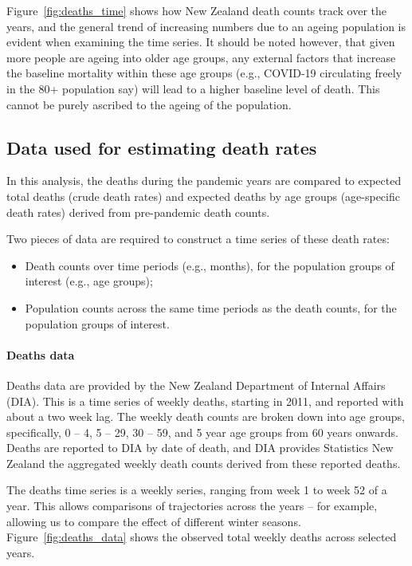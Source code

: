 \documentclass[
10pt, %
a4paper, %
oneside, %
DIV=16,
parskip=full,
headinclude,footinclude %
]{scrartcl}
\begin{document}
Figure~\vref{fig:deaths_time} shows how New Zealand death counts track over the years, and the general trend of increasing numbers due to an ageing population is evident when examining the time series. It should be noted however, that given more people are ageing into older age groups, any external factors that increase the baseline mortality within these age groups (e.g., COVID-19 circulating freely in the 80+ population say) will lead to a higher baseline level of death. This cannot be purely ascribed to the ageing of the population.


\subsection{Data used for estimating death rates}\label{subsec:data}

In this analysis, the deaths during the pandemic years are compared to expected total deaths (crude death rates) and expected deaths by age groups (age-specific death rates) derived from pre-pandemic death counts. 

Two pieces of data are required to construct a time series of these death rates:

\begin{itemize}
    \item Death counts over time periods (e.g., months), for the population groups of interest (e.g., age groups);
    \item Population counts across the same time periods as the death counts, for the population groups of interest.
\end{itemize}

\paragraph{Deaths data} Deaths data are provided by the New Zealand Department of Internal Affairs (DIA). This is a time series of weekly deaths, starting in 2011, and reported with about a two week lag. The weekly death counts are broken down into age groups, specifically, 0 -- 4, 5 -- 29, 30 -- 59, and 5 year age groups from 60 years onwards. Deaths are reported to DIA by date of death, and DIA provides Statistics New Zealand the aggregated weekly death counts derived from these reported deaths.

The deaths time series is a weekly series, ranging from week 1 to week 52 of a year. This allows comparisons of trajectories across the years -- for example, allowing us to compare the effect of different winter seasons. Figure~\vref{fig:deaths_data} shows the observed total weekly deaths across selected years.
\end{document}
